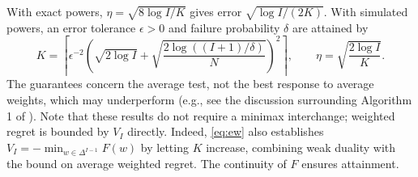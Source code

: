 \documentclass[11pt]{article}
\newtheorem{corollary}{Corollary}
\newcommand{\CS}{\mathcal{C}_{\alpha}}
\newcommand{\Reg}{\mathcal{R}}
\newcommand{\TV}{d_{\mathrm{TV}}}
\begin{document}
With exact powers, $\eta=\sqrt{8\log I/K}$ gives error $\sqrt{\log I/(2K)}$. With simulated powers, an error tolerance $\epsilon>0$ and failure probability $\delta$ are attained by
\begin{equation}\label{eq:iterations} K=\left\lceil\epsilon^{-2}\left(\sqrt{2\log I}+\sqrt{\frac{2\log((I+1)/\delta)}N}\right)^2\right\rceil,\qquad \eta=\sqrt{\frac{2\log I}{K}}. \end{equation}
The guarantees concern the average test, not the best response to average weights, which may underperform (e.g., see the discussion surrounding Algorithm 1 of \cite{aradillas2025approximate}). Note that these results do not require a minimax interchange; weighted regret is bounded by $V_I$ directly. Indeed, \eqref{eq:ew} also establishes $V_I=-\min_{w\in\Delta^{I-1}}F(w)$ by letting $K$ increase, combining weak duality with the bound on average weighted regret. The continuity of $F$ ensures attainment.




\end{document}

